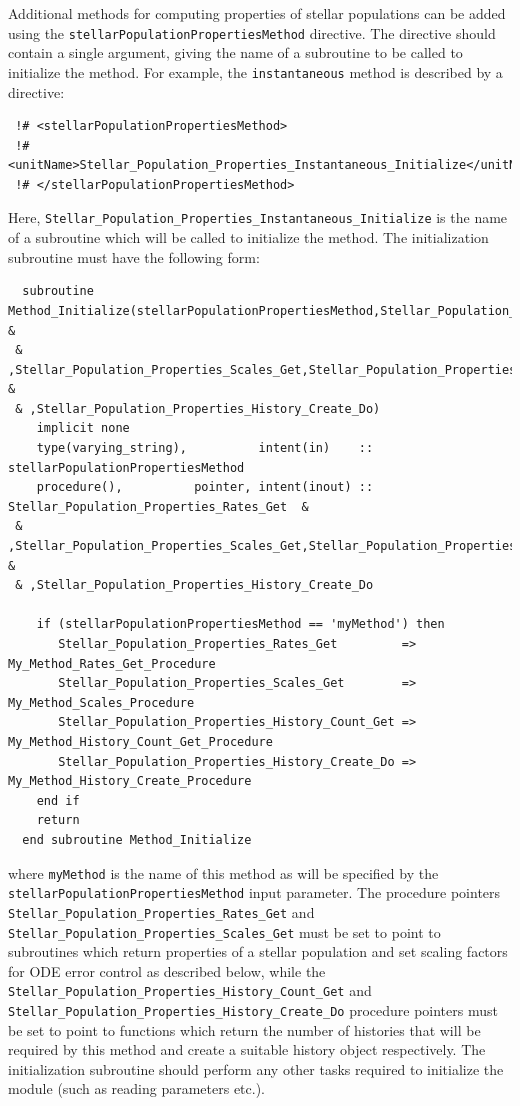Additional methods for computing properties of stellar populations can be added using the {\tt stellarPopulationPropertiesMethod} directive. The directive should contain a single argument, giving the name of a subroutine to be called to initialize the method. For example, the {\tt instantaneous} method is described by a directive:
\begin{verbatim}
 !# <stellarPopulationPropertiesMethod>
 !#  <unitName>Stellar_Population_Properties_Instantaneous_Initialize</unitName>
 !# </stellarPopulationPropertiesMethod>
\end{verbatim}
Here, {\tt Stellar\_Population\_Properties\_Instantaneous\_Initialize} is the name of a subroutine which will be called to initialize the method. The initialization subroutine must have the following form:
\begin{verbatim}
  subroutine Method_Initialize(stellarPopulationPropertiesMethod,Stellar_Population_Properties_Rates_Get &
 & ,Stellar_Population_Properties_Scales_Get,Stellar_Population_Properties_History_Count_Get             &
 & ,Stellar_Population_Properties_History_Create_Do)
    implicit none
    type(varying_string),          intent(in)    :: stellarPopulationPropertiesMethod
    procedure(),          pointer, intent(inout) :: Stellar_Population_Properties_Rates_Get  &
 & ,Stellar_Population_Properties_Scales_Get,Stellar_Population_Properties_History_Count_Get &
 & ,Stellar_Population_Properties_History_Create_Do
    
    if (stellarPopulationPropertiesMethod == 'myMethod') then
       Stellar_Population_Properties_Rates_Get         => My_Method_Rates_Get_Procedure
       Stellar_Population_Properties_Scales_Get        => My_Method_Scales_Procedure
       Stellar_Population_Properties_History_Count_Get => My_Method_History_Count_Get_Procedure
       Stellar_Population_Properties_History_Create_Do => My_Method_History_Create_Procedure
    end if
    return
  end subroutine Method_Initialize
\end{verbatim}
where {\tt myMethod} is the name of this method as will be specified by the {\tt stellarPopulationPropertiesMethod} input parameter. The procedure pointers {\tt Stellar\_Population\_Properties\_Rates\_Get} and {\tt Stellar\_Population\_Properties\_Scales\_Get} must be set to point to subroutines which return properties of a stellar population and set scaling factors for ODE error control as described below, while the {\tt Stellar\_Population\_Properties\_History\_Count\_Get} and {\tt Stellar\_Population\_Properties\_History\_Create\_Do} procedure pointers must be set to point to functions which return the number of histories that will be required by this method and create a suitable history object respectively. The initialization subroutine should perform any other tasks required to initialize the module (such as reading parameters etc.).

